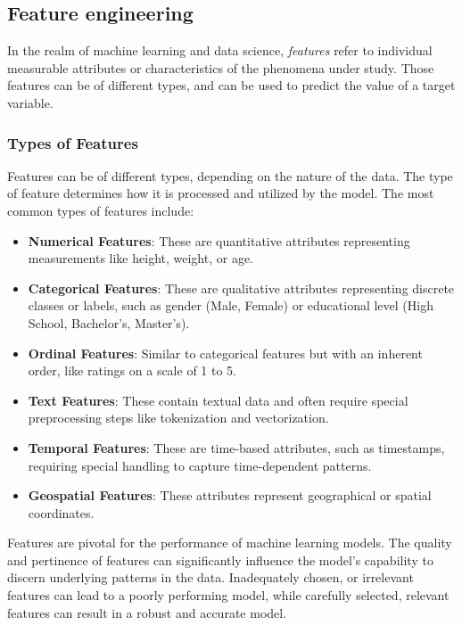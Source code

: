     \subsection{Feature engineering}
    In the realm of machine learning and data science, \textit{features} refer to individual measurable attributes or characteristics of the phenomena under study. Those features can be of different types, and can be used to predict the value of a target variable. 
    
    \subsubsection{Types of Features}
    Features can be of different types, depending on the nature of the data. The type of feature determines how it is processed and utilized by the model. The most common types of features include:

    \begin{itemize}
        \item \textbf{Numerical Features}: These are quantitative attributes representing measurements like height, weight, or age.
        \item \textbf{Categorical Features}: These are qualitative attributes representing discrete classes or labels, such as gender (Male, Female) or educational level (High School, Bachelor's, Master's).
        \item \textbf{Ordinal Features}: Similar to categorical features but with an inherent order, like ratings on a scale of 1 to 5.
        \item \textbf{Text Features}: These contain textual data and often require special preprocessing steps like tokenization and vectorization.
        \item \textbf{Temporal Features}: These are time-based attributes, such as timestamps, requiring special handling to capture time-dependent patterns.
        \item \textbf{Geospatial Features}: These attributes represent geographical or spatial coordinates.
    \end{itemize}

    Features are pivotal for the performance of machine learning models. The quality and pertinence of features can significantly influence the model's capability to discern underlying patterns in the data. Inadequately chosen, or irrelevant features can lead to a poorly performing model, while carefully selected, relevant features can result in a robust and accurate model.

